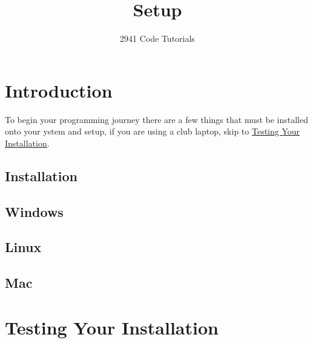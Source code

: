 \documentclass[12pt]{article} %
\title{Setup}
\author{2941 Code Tutorials} %
\begin{document}
\maketitle 
\tableofcontents

\pagebreak

\section{Introduction}

To begin your programming journey there are a few things that must be installed onto your ystem and setup, 
if you are using a club laptop, skip to \hyperref[sec:testing]{Testing Your Installation}.

\subsection{Installation}

\subsection*{Windows}

\subsection*{Linux}

\subsection*{Mac}

\section{Testing Your Installation}
\label{sec:testing}
\end{document}
